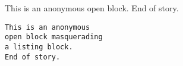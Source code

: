 This is an anonymous
open block.
End of story.
\begin{verbatim}
This is an anonymous
open block masquerading
a listing block.
End of story.
\end{verbatim}
